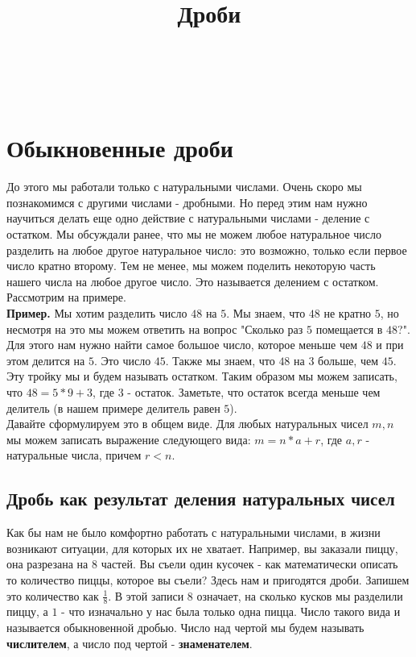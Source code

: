 \documentclass{article}
\title{Дроби}
\author{~}
\date{~}
\begin{document}
\maketitle
\section{Обыкновенные дроби}
До этого мы работали только с натуральными числами. Очень скоро мы познакомимся с другими числами - дробными. Но перед этим нам нужно научиться делать еще одно действие с натуральными числами - деление с остатком. Мы обсуждали ранее, что мы не можем любое натуральное число разделить на любое другое натуральное число: это возможно, только если первое число кратно второму. Тем не менее, мы можем поделить некоторую часть нашего числа на любое другое число. Это называется делением с остатком. Рассмотрим на примере.\\

\textbf{Пример.} Мы хотим разделить число $48$ на $5$. Мы знаем, что $48$ не кратно $5$, но несмотря на это мы можем ответить на вопрос "Сколько раз $5$ помещается в $48$?". Для этого нам нужно найти самое большое число, которое меньше чем $48$ и при этом делится на $5$. Это число $45$. Также мы знаем, что $48$ на $3$ больше, чем $45$. Эту тройку мы и будем называть остатком. Таким образом мы можем записать, что $48 = 5*9 +3$, где $3$ - остаток. Заметьте, что остаток всегда меньше чем делитель (в нашем примере делитель равен $5$).\\

Давайте сформулируем это в общем виде. Для любых натуральных чисел $m, n$ мы можем записать выражение следующего вида: $m = n*a + r$, где $a, r$ - натуральные числа, причем $r < n$.
\subsection{Дробь как результат деления натуральных чисел}
Как бы нам не было комфортно работать с натуральными числами, в жизни возникают ситуации, для которых их не хватает. Например, вы заказали пиццу, она разрезана на 8 частей. Вы съели один кусочек - как математически описать то количество пиццы, которое вы съели? Здесь нам и пригодятся дроби. Запишем это количество как $\frac1{8}$. В этой записи $8$ означает, на сколько кусков мы разделили пиццу, а $1$ - что изначально у нас была только одна пицца. Число такого вида и называется обыкновенной дробью. Число над чертой мы будем называть \textbf{числителем}, а число под чертой - \textbf{знаменателем}.\\
\end{document}
